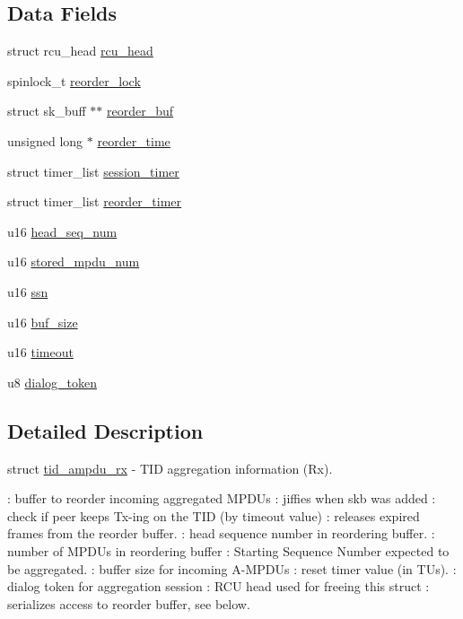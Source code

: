 \subsection*{Data Fields}
\begin{DoxyCompactItemize}
\item 
struct rcu\-\_\-head \hyperlink{structtid__ampdu__rx_ab698383409a24791490f962fe6990655}{rcu\-\_\-head}
\item 
spinlock\-\_\-t \hyperlink{structtid__ampdu__rx_a60a5d0df4d272ca8f03273796f2f9abb}{reorder\-\_\-lock}
\item 
struct sk\-\_\-buff $\ast$$\ast$ \hyperlink{structtid__ampdu__rx_a271b63a3f29606b2e6eb7242449573fa}{reorder\-\_\-buf}
\item 
unsigned long $\ast$ \hyperlink{structtid__ampdu__rx_a36ab2908090be3b171339cc81fe59f85}{reorder\-\_\-time}
\item 
struct timer\-\_\-list \hyperlink{structtid__ampdu__rx_a96b57b74220e5b5898ffd791809d9dfe}{session\-\_\-timer}
\item 
struct timer\-\_\-list \hyperlink{structtid__ampdu__rx_a53b375729eed85a579140f1ba58dae16}{reorder\-\_\-timer}
\item 
u16 \hyperlink{structtid__ampdu__rx_a785baa393ccdd0e322afa926c211c5d5}{head\-\_\-seq\-\_\-num}
\item 
u16 \hyperlink{structtid__ampdu__rx_af841b3070ad65b70ebaccb5d7d3349d3}{stored\-\_\-mpdu\-\_\-num}
\item 
u16 \hyperlink{structtid__ampdu__rx_af1c6bb9db8bba4a7e89d3f6896847adc}{ssn}
\item 
u16 \hyperlink{structtid__ampdu__rx_a90486436f413e5f94517020f841025d2}{buf\-\_\-size}
\item 
u16 \hyperlink{structtid__ampdu__rx_a735bf6536b07682f96c9417b0f1e9079}{timeout}
\item 
u8 \hyperlink{structtid__ampdu__rx_a6ad691d9e8c744adc654ff53c98502d2}{dialog\-\_\-token}
\end{DoxyCompactItemize}


\subsection{Detailed Description}
struct \hyperlink{structtid__ampdu__rx}{tid\-\_\-ampdu\-\_\-rx} -\/ T\-I\-D aggregation information (Rx).

\-: buffer to reorder incoming aggregated M\-P\-D\-Us \-: jiffies when skb was added \-: check if peer keeps Tx-\/ing on the T\-I\-D (by timeout value) \-: releases expired frames from the reorder buffer. \-: head sequence number in reordering buffer. \-: number of M\-P\-D\-Us in reordering buffer \-: Starting Sequence Number expected to be aggregated. \-: buffer size for incoming A-\/\-M\-P\-D\-Us \-: reset timer value (in T\-Us). \-: dialog token for aggregation session \-: R\-C\-U head used for freeing this struct \-: serializes access to reorder buffer, see below.


